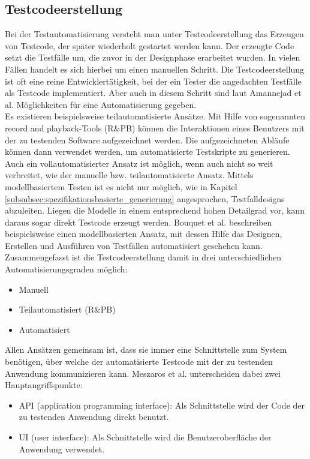 \subsection{Testcodeerstellung}
\label{subsec:testcodeerstellung}
Bei der Testautomatisierung versteht man unter Testcodeerstellung das Erzeugen von Testcode, der später wiederholt gestartet werden kann. Der erzeugte Code setzt die Testfälle um, die zuvor in der Designphase erarbeitet wurden.
In vielen Fällen handelt es sich hierbei um einen manuellen Schritt. Die Testcodeerstellung ist oft eine reine Entwicklertätigkeit, bei der ein Tester die angedachten Testfälle als Testcode implementiert.
Aber auch in diesem Schritt sind laut Amannejad et al. \cite{amannejad_search-based_2014} Möglichkeiten für eine Automatisierung gegeben.\\
Es existieren beispielsweise teilautomatisierte Ansätze. Mit Hilfe von sogenannten \grq record and playback\grq-Tools (R\&PB) können die Interaktionen eines Benutzers mit der zu testenden Software aufgezeichnet werden. Die aufgezeichneten Abläufe können dann verwendet werden, um automatisierte Testskripte zu generieren.\\
Auch ein vollautomatisierter Ansatz ist möglich, wenn auch nicht so weit verbreitet, wie der manuelle bzw. teilautomatisierte Ansatz.
Mittels modellbasiertem Testen ist es nicht nur möglich, wie in Kapitel \ref{subsubsec:spezifikationsbasierte_generierung} angesprochen, Testfalldesigns abzuleiten. Liegen die Modelle in einem entsprechend hohen Detailgrad vor, kann daraus sogar direkt Testcode erzeugt werden. Bouquet et al. \cite{bouquet_test_2008} beschreiben beispielsweise einen modellbasierten Ansatz, mit dessen Hilfe das Designen, Erstellen und Ausführen von Testfällen automatisiert geschehen kann.\\
Zusammengefasst ist die Testcodeerstellung damit in drei unterschiedlichen Automatisierungsgraden möglich:
\begin{itemize}
\item Manuell
\item Teilautomatisiert (R\&PB)
\item Automatisiert
\end{itemize}

Allen Ansätzen gemeinsam ist, dass sie immer eine Schnittstelle zum System benötigen, über welche der automatisierte Testcode mit der zu testenden Anwendung kommunizieren kann.
Meszaros et al. \cite{meszaros_agile_2003} unterscheiden dabei zwei Hauptangriffspunkte:
\begin{itemize}
\item API (application programming interface): Als Schnittstelle wird der Code der zu testenden Anwendung direkt benutzt.
\item UI (user interface): Als Schnittstelle wird die Benutzeroberfläche der Anwendung verwendet.
\end{itemize}

